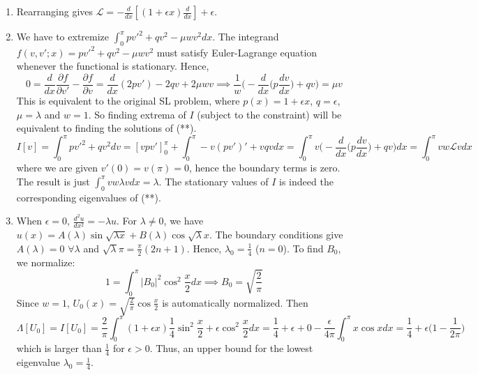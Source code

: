 \documentclass[a4paper]{article}
\begin{document}
\begin{ans}\leavevmode
\begin{enumerate}[label=(\roman*)]
\item Rearranging gives $\mathcal{L}=-\frac{d}{dx}[(1+\epsilon x)\frac{d}{dx}]+\epsilon$.
\item We have to extremize $\int_0^\pi pv'^2+qv^2-\mu wv^2dx$. The integrand $f(v,v';x)=pv'^2+qv^2-\mu wv^2$ must satisfy Euler-Lagrange equation whenever the functional is stationary. Hence,
$$0=\frac{d}{dx}\frac{\partial f}{\partial v'}-\frac{\partial f}{\partial v}=\frac{d}{dx}(2pv')-2qv+2\mu wv\implies\frac{1}{w}\bigg(-\frac{d}{dx}\bigg(p\frac{dv}{dx}\bigg)+qv\bigg)=\mu v$$
This is equivalent to the original SL problem, where $p(x)=1+\epsilon x$, $q=\epsilon$, $\mu=\lambda$ and $w=1$. So finding extrema of $I$ (subject to the constraint) will be equivalent to finding the solutions of (**). 
$$I[v]=\int_0^\pi pv'^2+qv^2dv=[vpv']_0^\pi+\int_0^\pi-v(pv')'+vqvdx=\int_0^\pi v\bigg(-\frac{d}{dx}\bigg(p\frac{dv}{dx}\bigg)+qv\bigg)dx=\int_0^\pi vw\mathcal{L}vdx$$
where we are given $v'(0)=v(\pi)=0$, hence the boundary terms is zero. The result is just $\int_0^\pi vw\lambda vdx=\lambda$. 
The stationary values of $I$ is indeed the corresponding eigenvalues of (**).
\item When $\epsilon=0$, $\frac{d^2u}{dx^2}=-\lambda u$. For $\lambda\neq 0$, we have $u(x)=A(\lambda)\sin\sqrt{\lambda x}+B(\lambda)\cos\sqrt{\lambda}x$. The boundary conditions give $A(\lambda)=0$ $\forall\lambda$ and $\sqrt{\lambda}\pi=\frac{\pi}{2}(2n+1)$. Hence, $\lambda_0=\frac{1}{4}$ ($n=0$). To find $B_0$, we normalize:
$$1=\int_0^\pi|B_0|^2\cos^2\frac{x}{2}dx\implies B_0=\sqrt{\frac{2}{\pi}}$$
Since $w=1$, $U_0(x)=\sqrt{\frac{2}{\pi}}\cos\frac{x}{2}$ is automatically normalized. Then
$$\Lambda[U_0]=I[U_0]=\frac{2}{\pi}\int_0^\pi(1+\epsilon x)\frac{1}{4}\sin^2\frac{x}{2}+\epsilon\cos^2\frac{x}{2}dx=\frac{1}{4}+\epsilon+0-\frac{\epsilon}{4\pi}\int_0^\pi x\cos xdx=\frac{1}{4}+\epsilon\bigg(1-\frac{1}{2\pi}\bigg)$$
which is larger than $\frac{1}{4}$ for $\epsilon>0$. Thus, an upper bound for the lowest eigenvalue $\lambda_0=\frac{1}{4}$.
\end{enumerate}
\end{ans}
\newpage
\end{document}
